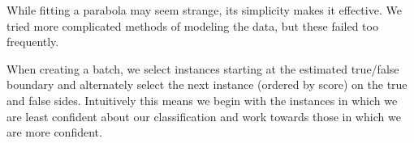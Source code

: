 \documentclass[ms,electronic,twosidetoc,letterpaper,chaptercenter,parttop,lof,lot]{byumsphd}
\begin{document}
While fitting a parabola may seem strange, its simplicity makes it effective. We tried more complicated methods of modeling the data, but these failed too frequently.

When creating a batch, we select instances starting at the estimated true/false boundary and alternately select the next instance (ordered by score) on the true and false sides. Intuitively this means we begin with the instances in which we are least confident about our classification and work towards those in which we are more confident.



\end{document}
